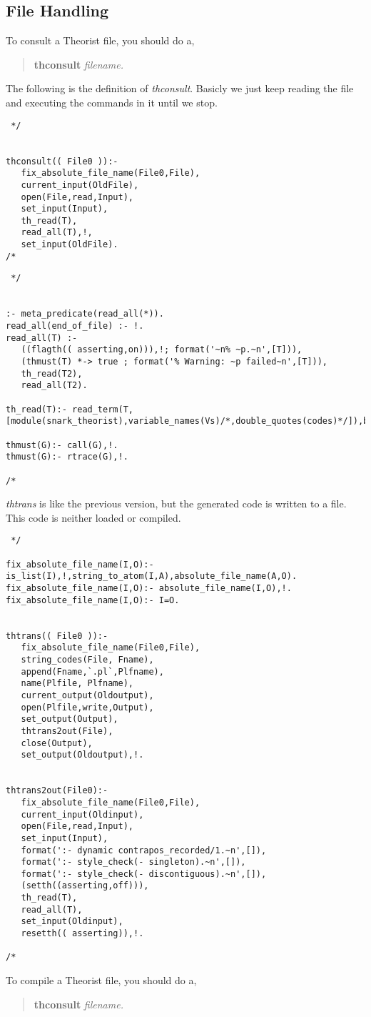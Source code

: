 \subsection{File Handling}
To consult a Theorist file, you should do a,
\begin{verse}
{\bf thconsult} \em filename.
\end{verse}
The following is the definition of {\em thconsult}. Basicly we just
keep reading the file and executing the commands in it until we stop.
\begin{verbatim} */


thconsult(( File0 )):-
   fix_absolute_file_name(File0,File),
   current_input(OldFile),
   open(File,read,Input),
   set_input(Input),
   th_read(T),
   read_all(T),!,
   set_input(OldFile).
/* \end{verbatim}
\begin{verbatim} */


:- meta_predicate(read_all(*)).
read_all(end_of_file) :- !.
read_all(T) :-
   ((flagth(( asserting,on))),!; format('~n% ~p.~n',[T])),
   (thmust(T) *-> true ; format('% Warning: ~p failed~n',[T])),
   th_read(T2),
   read_all(T2).

th_read(T):- read_term(T,[module(snark_theorist),variable_names(Vs)/*,double_quotes(codes)*/]),b_setval('$variable_names',Vs).
                 
thmust(G):- call(G),!.
thmust(G):- rtrace(G),!.

/* \end{verbatim}

{\em thtrans} is like the previous version, but the generated code is written
to a file. This code is neither loaded or compiled.
\begin{verbatim} */

fix_absolute_file_name(I,O):- is_list(I),!,string_to_atom(I,A),absolute_file_name(A,O).
fix_absolute_file_name(I,O):- absolute_file_name(I,O),!.
fix_absolute_file_name(I,O):- I=O.


thtrans(( File0 )):-
   fix_absolute_file_name(File0,File),
   string_codes(File, Fname),
   append(Fname,`.pl`,Plfname),
   name(Plfile, Plfname),
   current_output(Oldoutput),
   open(Plfile,write,Output),
   set_output(Output),
   thtrans2out(File),
   close(Output),
   set_output(Oldoutput),!.
   

thtrans2out(File0):-
   fix_absolute_file_name(File0,File),
   current_input(Oldinput),
   open(File,read,Input),
   set_input(Input),
   format(':- dynamic contrapos_recorded/1.~n',[]),
   format(':- style_check(- singleton).~n',[]),
   format(':- style_check(- discontiguous).~n',[]),
   (setth((asserting,off))),
   th_read(T),
   read_all(T),
   set_input(Oldinput),
   resetth(( asserting)),!.

/* \end{verbatim}
To compile a Theorist file, you should do a,
\begin{verse}
{\bf thconsult} \em filename.
\end{verse}

